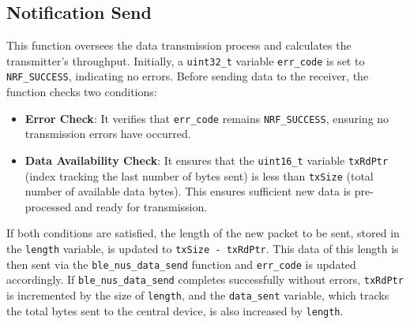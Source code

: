 \documentclass{Configuration_Files/PoliMi3i_thesis}
\begin{document}
\subsection*{Notification Send}
This function oversees the data transmission process and calculates the transmitter's throughput. Initially, a \texttt{uint32\_t} variable \texttt{err\_code} is set to \texttt{NRF\_SUCCESS}, indicating no errors. Before sending data to the receiver, the function checks two conditions:

\begin{itemize}
    \item \textbf{Error Check}: It verifies that \texttt{err\_code} remains \texttt{NRF\_SUCCESS}, ensuring no transmission errors have occurred.
    \item \textbf{Data Availability Check}: It ensures that the \texttt{uint16\_t} variable \texttt{txRdPtr} (index tracking the last number of bytes sent) is less than \texttt{txSize} (total number of available data bytes). This ensures sufficient new data is pre-processed and ready for transmission.
\end{itemize}

If both conditions are satisfied, the length of the new packet to be sent, stored in the \texttt{length} variable, is updated to \texttt{txSize - txRdPtr}. This data of this length is then sent via the \texttt{ble\_nus\_data\_send} function and \texttt{err\_code} is updated accordingly. If \texttt{ble\_nus\_data\_send} completes successfully without errors, \texttt{txRdPtr} is incremented by the size of \texttt{length}, and the \texttt{data\_sent} variable, which tracks the total bytes sent to the central device, is also increased by \texttt{length}. 
\end{document}
